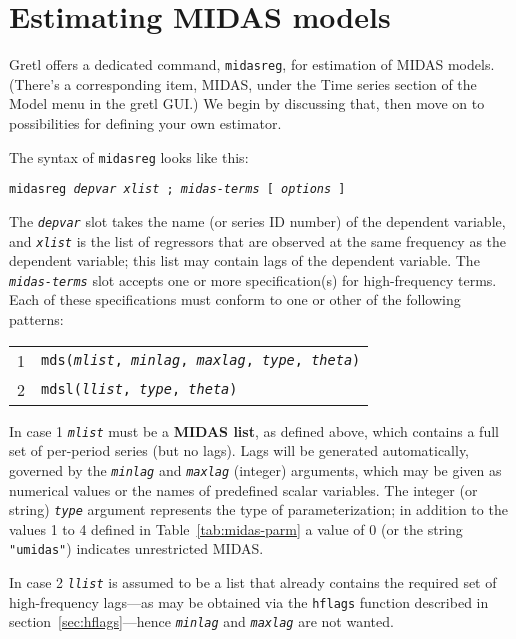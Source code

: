 \section{Estimating MIDAS models}
\label{sec:estimation}

Gretl offers a dedicated command, \texttt{midasreg}, for estimation of
MIDAS models. (There's a corresponding item, \textsf{MIDAS}, under the
\textsf{Time series} section of the \textsf{Model} menu in the gretl
GUI.) We begin by discussing that, then move on to possibilities for
defining your own estimator.

The syntax of \texttt{midasreg} looks like this:

\texttt{midasreg \textsl{depvar} \textsl{xlist} ;
\textsl{midas-terms} [ \textsl{options} ]}

The \texttt{\textsl{depvar}} slot takes the name (or series ID number)
of the dependent variable, and \texttt{\textsl{xlist}} is the list of
regressors that are observed at the same frequency as the dependent
variable; this list may contain lags of the dependent variable. The
\texttt{\textsl{midas-terms}} slot accepts one or more specification(s)
for high-frequency terms. Each of these specifications must conform to
one or other of the following patterns:

\begin{tabular}{ll}
1 & \texttt{mds(\textsl{mlist}, \textsl{minlag}, 
   \textsl{maxlag}, \textsl{type}, \textsl{theta})} \\
2 & \texttt{mdsl(\textsl{llist}, \textsl{type}, \textsl{theta})}
\end{tabular}

In case 1 \texttt{\textsl{mlist}} must be a \textbf{MIDAS list}, as
defined above, which contains a full set of per-period series (but no
lags). Lags will be generated automatically, governed by the
\texttt{\textsl{minlag}} and \texttt{\textsl{maxlag}} (integer)
arguments, which may be given as numerical values or the names of
predefined scalar variables. The integer (or string)
\texttt{\textsl{type}} argument represents the type of
parameterization; in addition to the values 1 to 4 defined in
Table~\ref{tab:midas-parm} a value of 0 (or the string
\verb|"umidas"|) indicates unrestricted MIDAS.

In case 2 \texttt{\textsl{llist}} is assumed to be a list that
already contains the required set of high-frequency lags---as may be
obtained via the \texttt{hflags} function described in
section~\ref{sec:hflags}---hence \texttt{\textsl{minlag}} and
\texttt{\textsl{maxlag}} are not wanted.

